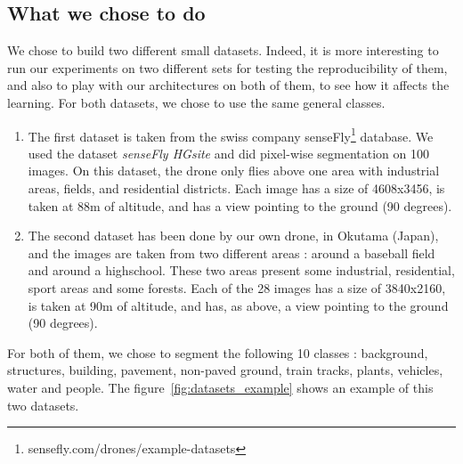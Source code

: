 \subsection{What we chose to do}
We chose to build two different small datasets. Indeed, it is more interesting to run our experiments on two different sets for testing the reproducibility of them, and also to play with our architectures on both of them, to see how it affects the learning. For both datasets, we chose to use the same general classes.
\begin{enumerate}
\item The first dataset is taken from the swiss company senseFly\footnote{sensefly.com/drones/example-datasets} database. We used the dataset \textit{senseFly HGsite} and did pixel-wise segmentation on 100 images. On this dataset, the drone only flies above one area with industrial areas, fields, and residential districts. Each image has a size of 4608x3456, is taken at 88m of altitude, and has a view pointing to the ground (90 degrees).
\item The second dataset has been done by our own drone, in Okutama (Japan), and the images are taken from two different areas : around a baseball field and around a highschool. These two areas present some industrial, residential, sport areas and some forests. Each of the 28 images has a size of 3840x2160, is taken at 90m of altitude, and has, as above, a view pointing to the ground (90 degrees).
\end{enumerate}
For both of them, we chose to segment the following 10 classes : background, structures, building, pavement, non-paved ground, train tracks, plants, vehicles, water and people. The figure~\ref{fig:datasets_example} shows an example of this two datasets.

